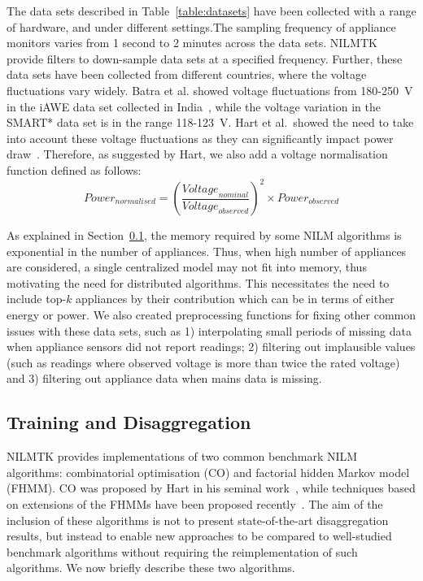 \documentclass{sig-alternate}
\newcommand{\redcolor}[1]{\textcolor{red}{#1}}
\newcommand{\secref}[1]{Section~\ref{#1}}
\newcommand{\tabref}[1]{Table~\ref{#1}}
\begin{document}
\noindent
The data sets described in \tabref{table:datasets} have been collected with a range of hardware, and under different settings.The sampling frequency of appliance monitors varies from 1 second to 2 minutes across the data sets.  NILMTK provide filters to down-sample data sets at a specified frequency. Further, these data sets have been collected from different countries, where the voltage fluctuations vary widely. Batra et al. showed voltage fluctuations from 180-250~V in the iAWE data set collected in India~\cite{iawe}, while the voltage variation in the SMART* data set is in the range 118-123~V. Hart et al.\ showed the need to take into account these voltage fluctuations as they can significantly impact power draw~\cite{hart_1992}. Therefore, as suggested by Hart, we also add a voltage normalisation function defined as follows: 
\begin{equation}
\textit{Power}_{\textit{normalised}} = 
\left(\frac{\textit{Voltage}_{\textit{nominal}}}{\textit{Voltage}_{\textit{observed}}}\right)^2 
\times \textit{Power}_{\textit{observed}}
\end{equation}

As explained in \secref{sec:training}, the memory required by some NILM algorithms is exponential in the number of appliances. Thus, when high number of appliances are considered, a single centralized model may not fit into memory, thus motivating the need for distributed algorithms. This necessitates the need to include top-$k$ appliances by their contribution which can be in terms of either energy or power.  We also created preprocessing functions for fixing other common issues with these data sets, such as 1) interpolating small periods of missing data when appliance sensors did not report readings; 2) filtering out implausible values (such as readings where observed voltage is more than twice the rated voltage) and 3) filtering out appliance data when mains data is missing.

\subsection{Training and Disaggregation}
\label{sec:training}
\noindent
NILMTK provides implementations of two common benchmark NILM algorithms: combinatorial optimisation (CO) and factorial hidden Markov model (FHMM). CO was proposed by Hart in his seminal work~\cite{hart_1992}, while techniques based on extensions of the FHMMs have been proposed recently~\cite{redd,kim_2011}. The aim of the inclusion of these algorithms is not to present state-of-the-art disaggregation results, but instead to enable new approaches to be compared to well-studied benchmark algorithms without requiring the reimplementation of such algorithms. We now briefly describe these two algorithms.
\end{document}
